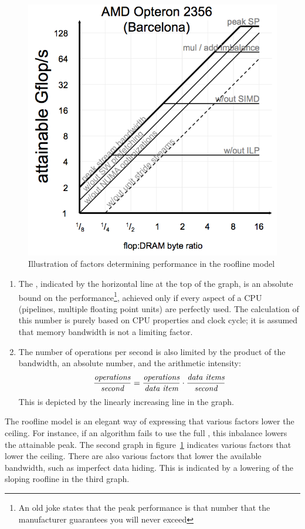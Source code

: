 \begin{figure}[p]
  \includegraphics[scale=.1]{graphics-public/roofline3}

  \caption{Illustration of factors determining performance in the roofline model}
  \label{fig:roofline}
\end{figure}
\begin{enumerate}
\item The , indicated by the horizontal
  line at the top of the graph, is an absolute bound on the
  performance\footnote {An old joke states that the peak performance
    is that number that the manufacturer guarantees you will never
    exceed}, achieved only if every aspect of a CPU (pipelines,
  multiple floating point units) are perfectly used. The calculation
  of this number is purely based on CPU properties and clock cycle; it
  is assumed that memory bandwidth is not a limiting factor.
\item The number of operations per second is also limited by the
  product of the bandwidth, an absolute number, and the arithmetic
  intensity:
  \[ \frac{\hbox{\it operations}}{\hbox{\it second}}=
  \frac{\hbox{\it operations}}{\hbox{\it data item}}\cdot
  \frac{\hbox{\it data items}}{\hbox{\it second}}
  \]
  This is depicted by the linearly increasing line in the graph.
\end{enumerate}
The roofline model is an elegant way of expressing that various
factors lower the ceiling.  For instance, if an algorithm fails to use
the full , this inbalance lowers the
attainable peak.  The second graph in figure~\ref{fig:roofline}
indicates various factors that lower the ceiling.
%
There are also various factors that lower the available bandwidth,
such as imperfect data hiding. This is indicated by a lowering of the 
sloping roofline in the third graph.

